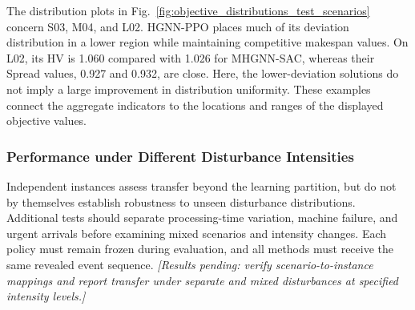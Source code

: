 The distribution plots in Fig.~\ref{fig:objective_distributions_test_scenarios} concern S03, M04,
and L02. HGNN-PPO places much of its deviation distribution in a lower region while maintaining competitive makespan values.
On L02, its HV is 1.060 compared with 1.026 for MHGNN-SAC, whereas their Spread values, 0.927 and 0.932,
are close. Here, the lower-deviation solutions do not imply a large improvement in distribution uniformity.
These examples connect the aggregate indicators to the locations and ranges of the displayed objective values.


\subsubsection{Performance under Different Disturbance Intensities}

Independent instances assess transfer beyond the learning partition, but do not by themselves establish
robustness to unseen disturbance distributions. Additional tests should separate processing-time variation,
machine failure, and urgent arrivals before examining mixed scenarios and intensity changes.
Each policy must remain frozen during evaluation, and all methods must receive the same revealed event sequence.
\textit{[Results pending: verify scenario-to-instance mappings and report transfer under separate
and mixed disturbances at specified intensity levels.]}

